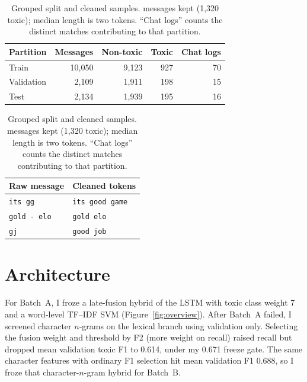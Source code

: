 \begin{table}[!ht]
\centering
\small
\setlength{\tabcolsep}{5pt}
\begin{minipage}[t]{0.58\linewidth}
  \centering
  \begin{tabular}{lrrrr}
  \toprule
  Partition & Messages & Non-toxic & Toxic & Chat logs \\
  \midrule
  Train & 10,050 & 9,123 & 927 & 70 \\
  Validation & 2,109 & 1,911 & 198 & 15 \\
  Test & 2,134 & 1,939 & 195 & 16 \\
  \bottomrule
  \end{tabular}
\end{minipage}
\hfill
\begin{minipage}[t]{0.38\linewidth}
  \centering
  \begin{tabular}{ll}
  \toprule
  Raw message & Cleaned tokens \\
  \midrule
  \texttt{its gg} & \texttt{its good game} \\
  \texttt{gold - elo} & \texttt{gold elo} \\
  \texttt{gj} & \texttt{good job} \\
  \bottomrule
  \end{tabular}
\end{minipage}
\caption{Grouped split and cleaned samples. \PreparedRows{} messages kept (1,320 toxic); median length is two tokens. ``Chat logs'' counts the distinct matches contributing to that partition.}
\label{tab:data}
\end{table}

\section*{Architecture}

For Batch~A, I froze a late-fusion hybrid of the LSTM with toxic class weight 7 and a word-level TF--IDF SVM (Figure~\ref{fig:overview}). After Batch~A failed, I screened character $n$-grams on the lexical branch using validation only. Selecting the fusion weight and threshold by F2 (more weight on recall) raised recall but dropped mean validation toxic F1 to 0.614, under my 0.671 freeze gate. The same character features with ordinary F1 selection hit mean validation F1 0.688, so I froze that character-$n$-gram hybrid for Batch~B.

